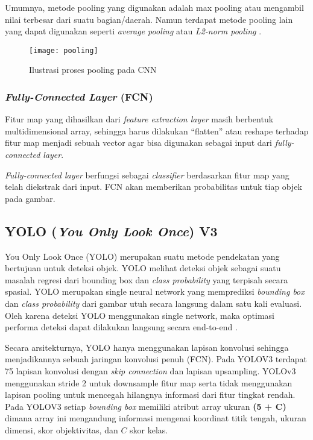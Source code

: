 \documentclass[../thesis.tex]{subfiles}
\begin{document}
Umumnya, metode pooling yang digunakan adalah max pooling atau mengambil nilai terbesar dari suatu bagian/daerah. Namun terdapat metode pooling lain yang dapat digunakan seperti \textit{average pooling} atau
\textit{L2-norm pooling} \cite{CNNinImageNet}.
\begin{figure}[htp]
	\centering
	\texttt{[image: pooling]}
	\caption{Ilustrasi proses pooling pada CNN}
	\label{pooling_CNN}
\end{figure}

\subsubsection{\textit{Fully-Connected Layer} (FCN)}
Fitur map yang dihasilkan dari \textit{feature extraction layer} masih berbentuk multidimensional array, sehingga harus dilakukan “flatten” atau reshape terhadap fitur map menjadi sebuah vector agar bisa digunakan sebagai input dari \textit{fully-connected layer}.

\textit{Fully-connected layer} berfungsi sebagai \textit{classifier} berdasarkan fitur map yang telah diekstrak dari input. FCN akan memberikan probabilitas untuk tiap objek pada gambar.

\subsection{YOLO (\textit{You Only Look Once}) V3}

You Only Look Once (YOLO) merupakan suatu metode pendekatan yang bertujuan untuk deteksi objek. YOLO melihat deteksi objek sebagai suatu masalah regresi dari bounding box dan
\textit{class probability} yang terpisah secara spasial. YOLO merupakan single neural network yang memprediksi \textit{bounding box} dan \textit{class probability} dari gambar utuh secara langsung dalam satu kali
evaluasi. Oleh karena deteksi YOLO menggunakan single network, maka optimasi performa deteksi dapat dilakukan langsung secara end-to-end \cite{YoloV1}.

Secara arsitekturnya, YOLO hanya menggunakan lapisan konvolusi sehingga menjadikannya sebuah jaringan konvolusi penuh (FCN). Pada YOLOV3 terdapat 75 lapisan konvolusi dengan \textit{skip connection} dan lapisan upsampling.
YOLOv3 menggunakan stride 2 untuk downsample fitur map serta tidak menggunakan lapisan pooling untuk mencegah hilangnya informasi dari fitur tingkat rendah. Pada YOLOV3 setiap \textit{bounding box} memiliki atribut array ukuran \textbf{(5 + C)} dimana array ini mengandung informasi
mengenai koordinat titik tengah, ukuran dimensi, skor objektivitas, dan $C$ skor kelas.
\end{document}
